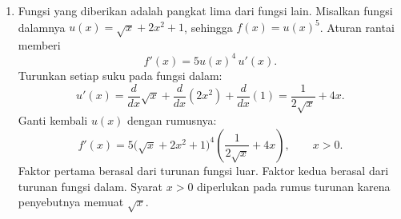\documentclass[10pt,letterpaper]{article}
\begin{document}
\begin{enumerate}
  \item Fungsi yang diberikan adalah pangkat lima dari fungsi lain.
        Misalkan fungsi dalamnya $u(x)=\sqrt{x}+2x^2+1$, sehingga $f(x)=u(x)^5$.
        Aturan rantai memberi
        \[
          f'(x)=5u(x)^4\,u'(x).
        \]
        Turunkan setiap suku pada fungsi dalam:
        \[
          u'(x)=\frac{d}{dx}\sqrt{x}+\frac{d}{dx}(2x^2)+\frac{d}{dx}(1)
          =\frac1{2\sqrt{x}}+4x.
        \]
        Ganti kembali $u(x)$ dengan rumusnya:
        \[
          \boxed{f'(x)=5\bigl(\sqrt{x}+2x^2+1\bigr)^4
            \left(\frac1{2\sqrt{x}}+4x\right),\qquad x>0}.
        \]
        Faktor pertama berasal dari turunan fungsi luar.
        Faktor kedua berasal dari turunan fungsi dalam.
        Syarat $x>0$ diperlukan pada rumus turunan karena penyebutnya memuat $\sqrt{x}$.

\end{enumerate}
\par\endgroup

\newpage
\end{document}
